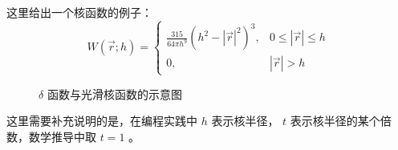 \begin{frame}
    这里给出一个核函数的例子：
    \begin{equation}
        W(\vec{r};h) = \begin{cases}
            \frac{315}{64\pi h^9} (h^2 - |\vec{r}|^2)^3, & 0 \leq |\vec{r}| \leq h \\
            0, & |\vec{r}| > h
        \end{cases}
    \end{equation}

    \begin{figure}[H]
        \centering
        \qquad
        \caption{$\delta$ 函数与光滑核函数的示意图}
    \end{figure}

    这里需要补充说明的是，在编程实践中 $h$ 表示核半径，
    $t$ 表示核半径的某个倍数，数学推导中取 $t = 1$ 。
\end{frame}

